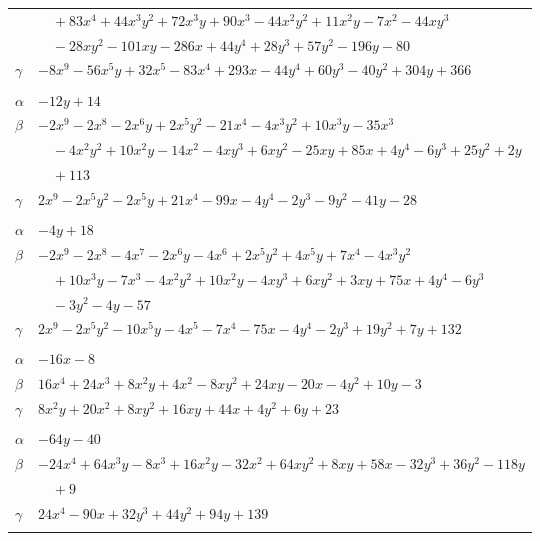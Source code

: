 \documentclass[11pt]{article}
\begin{document}
\begin{longtable}{@{}ll@{}}
 & $\quad +83x^{4}+44x^{3}y^{2}+72x^{3}y+90x^{3}-44x^{2}y^{2}+11x^{2}y-7x^{2}-44xy^{3}$\\
 & $\quad -28xy^{2}-101xy-286x+44y^{4}+28y^{3}+57y^{2}-196y-80$\\
$\gamma$ & $-8x^{9}-56x^{5}y+32x^{5}-83x^{4}+293x-44y^{4}+60y^{3}-40y^{2}+304y+366$\\
\addlinespace[3pt]
\multicolumn{2}{@{}l}{$\{i,j\}=\{24,25\}$, $k_{ij}=2\cdot 3\cdot 7$}\\
$\alpha$ & $-12y+14$\\
$\beta$ & $-2x^{9}-2x^{8}-2x^{6}y+2x^{5}y^{2}-21x^{4}-4x^{3}y^{2}+10x^{3}y-35x^{3}$\\
 & $\quad -4x^{2}y^{2}+10x^{2}y-14x^{2}-4xy^{3}+6xy^{2}-25xy+85x+4y^{4}-6y^{3}+25y^{2}+2y$\\
 & $\quad +113$\\
$\gamma$ & $2x^{9}-2x^{5}y^{2}-2x^{5}y+21x^{4}-99x-4y^{4}-2y^{3}-9y^{2}-41y-28$\\
\addlinespace[3pt]
\multicolumn{2}{@{}l}{$\{i,j\}=\{24,26\}$, $k_{ij}=2\cdot 3\cdot 5^{2}$}\\
$\alpha$ & $-4y+18$\\
$\beta$ & $-2x^{9}-2x^{8}-4x^{7}-2x^{6}y-4x^{6}+2x^{5}y^{2}+4x^{5}y+7x^{4}-4x^{3}y^{2}$\\
 & $\quad +10x^{3}y-7x^{3}-4x^{2}y^{2}+10x^{2}y-4xy^{3}+6xy^{2}+3xy+75x+4y^{4}-6y^{3}$\\
 & $\quad -3y^{2}-4y-57$\\
$\gamma$ & $2x^{9}-2x^{5}y^{2}-10x^{5}y-4x^{5}-7x^{4}-75x-4y^{4}-2y^{3}+19y^{2}+7y+132$\\
\addlinespace[3pt]
\multicolumn{2}{@{}l}{$\{i,j\}=\{24,30\}$, $k_{ij}=3\cdot 5$}\\
$\alpha$ & $-16x-8$\\
$\beta$ & $16x^{4}+24x^{3}+8x^{2}y+4x^{2}-8xy^{2}+24xy-20x-4y^{2}+10y-3$\\
$\gamma$ & $8x^{2}y+20x^{2}+8xy^{2}+16xy+44x+4y^{2}+6y+23$\\
\addlinespace[3pt]
\multicolumn{2}{@{}l}{$\{i,j\}=\{24,33\}$, $k_{ij}=3^{2}\cdot 11$}\\
$\alpha$ & $-64y-40$\\
$\beta$ & $-24x^{4}+64x^{3}y-8x^{3}+16x^{2}y-32x^{2}+64xy^{2}+8xy+58x-32y^{3}+36y^{2}-118y$\\
 & $\quad +9$\\
$\gamma$ & $24x^{4}-90x+32y^{3}+44y^{2}+94y+139$\\
\addlinespace[3pt]
\multicolumn{2}{@{}l}{$\{i,j\}=\{24,34\}$, $k_{ij}=2^{3}$}\\

\end{longtable}
\end{document}
